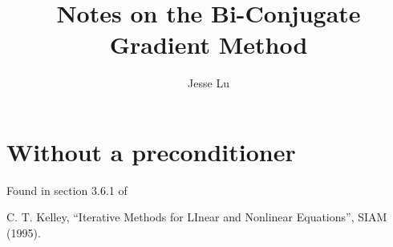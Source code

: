 \documentclass{article}
\title{Notes on the Bi-Conjugate Gradient Method}
\author{Jesse Lu}
\begin{document}
\maketitle
\section{Without a preconditioner}
Found in section 3.6.1 of \cite{kelley}

\begin{thebibliography}
\bibitem[kelley] C. T. Kelley, 
    ``Iterative Methods for LInear and Nonlinear Equations'', 
    SIAM (1995).
\end{thebibliography}
\end{document}
